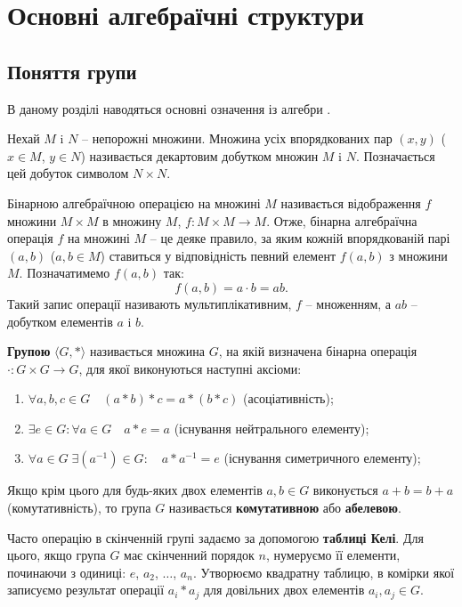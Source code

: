 \newpage


\renewcommand{\proofname}{Доведення}
\renewcommand{\chaptername}{РОЗДІЛ}
\chapter{Основні алгебраїчні структури}
\label{ch1}

\section{Поняття групи}
\label{section.1.1}

В даному розділі наводяться основні означення із алгебри \cite{Lang2002}.

Нехай $M$ i $N$ -- непорожні множини. Множина усіх впорядкованих пар $(x,y)$ ($x \in M$, $y \in N$) називається декартовим добутком множин $M$ i $N$. Позначається цей добуток символом $N\times N$.

Бінарною алгебраїчною операцією на множині $M$ називається відображення $f$ множини $M \times M$ в множину $M$, $f: M \times M \to M$. Отже, бінарна алгебраїчна операція $f$ на множині $M$ -- це деяке правило, за яким кожній впорядкованій парі $(a,b)$ ($a,b \in M$) ставиться у відповідність певний елемент $f(a,b)$ з множини $M$. Позначатимемо $f(a,b)$ так:
\[
f(a,b) = a \cdot b = ab.
\] 
Такий запис операції називають мультиплікативним, $f$ -- множенням, а $ab$ -- добутком елементів $a$ i $b$.

\textbf{Групою} $\langle G, * \rangle$ називається множина $G$, на якій визначена бінарна операція $\cdot: G\times G \to G$, для якої виконуються наступні аксіоми:
\begin{enumerate}[noitemsep,partopsep=0pt,topsep=0pt,parsep=0pt]
\item $\forall a,b,c \in G \quad (a*b)*c=a*(b*c)$ (асоціативність);
\item $\exists e \in G: \forall a \in G \quad a*e=a$ (існування нейтрального елементу);
\item $\forall a \in G \; \exists (a^{-1}) \in G: \quad a*a^{-1}=e$ (існування симетричного елементу);
\end{enumerate}
Якщо крім цього для будь-яких двох елементів $a,b \in G$ виконується $a+b=b+a$ (комутативність), то група $G$ називається \textbf{комутативною} або \textbf{абелевою}.

Часто операцію в скінченній групі задаємо за допомогою \textbf{таблиці Келі}. Для цього, якщо група $G$ має скінченний порядок $n$, нумеруємо її елементи, починаючи з одиниці: $e$, $a_2$, $\ldots$, $a_n$. Утворюємо квадратну таблицю, в комірки якої записуємо результат операції $a_i * a_j$ для довільних двох елементів $a_i, a_j \in G$.

